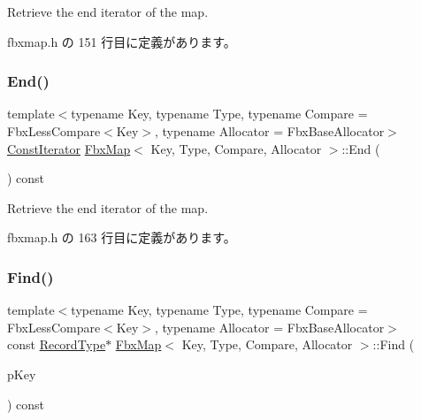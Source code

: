 Retrieve the end iterator of the map. 



 fbxmap.\+h の 151 行目に定義があります。

\mbox{\label{class_fbx_map_a76fc48a3c9243bcd747e6725a1e148b5}} 
\subsubsection{\texorpdfstring{End()}{End()}\hspace{0.1cm}{\footnotesize\ttfamily [2/2]}}
{\footnotesize\ttfamily template$<$typename Key, typename Type, typename Compare = Fbx\+Less\+Compare$<$\+Key$>$, typename Allocator = Fbx\+Base\+Allocator$>$ \\
\hyperlink{class_fbx_map_acf89f4bb5cf415e5e04087c2179bf367}{Const\+Iterator} \hyperlink{class_fbx_map}{Fbx\+Map}$<$ Key, Type, Compare, Allocator $>$\+::End (\begin{DoxyParamCaption}{ }\end{DoxyParamCaption}) const\hspace{0.3cm}{\ttfamily [inline]}}



Retrieve the end iterator of the map. 



 fbxmap.\+h の 163 行目に定義があります。

\mbox{\label{class_fbx_map_a39d841b85599678c497c960e060d3772}} 
\subsubsection{\texorpdfstring{Find()}{Find()}\hspace{0.1cm}{\footnotesize\ttfamily [1/2]}}
{\footnotesize\ttfamily template$<$typename Key, typename Type, typename Compare = Fbx\+Less\+Compare$<$\+Key$>$, typename Allocator = Fbx\+Base\+Allocator$>$ \\
const \hyperlink{class_fbx_map_af8fc887461b3bf29f41aa36d15ddb54f}{Record\+Type}$\ast$ \hyperlink{class_fbx_map}{Fbx\+Map}$<$ Key, Type, Compare, Allocator $>$\+::Find (\begin{DoxyParamCaption}\item[{const \hyperlink{class_fbx_map_ad8392c83b6f8eeb9e0706bcc8674270a}{Key\+Type} \&}]{p\+Key }\end{DoxyParamCaption}) const\hspace{0.3cm}{\ttfamily [inline]}}

